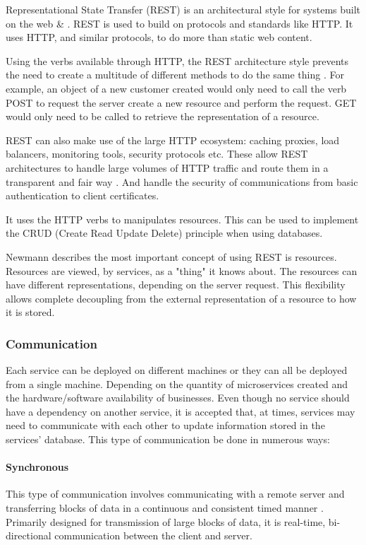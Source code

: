 Representational State Transfer (REST) is an architectural style for systems built on the web \cite{SchroderMSA} \& \cite{NewmanMSA}. REST is used to build on protocols and standards like HTTP.  It uses HTTP, and similar protocols, to do more than static web content. 

Using the verbs available through HTTP, the REST architecture style prevents the need to create a multitude of different methods to do the same thing \cite{NewmanMSA}. For example, an object of a new customer created would only need to call the verb POST to request the server create a new resource and perform the request. GET would only need to be called to retrieve the representation of a resource. 

REST can also make use of the large HTTP ecosystem: caching proxies, load balancers, monitoring tools, security protocols etc. These allow REST architectures to handle large volumes of HTTP traffic and route them in a transparent and fair way \cite{NewmanMSA}. And handle the security of communications from basic authentication to client certificates.

It uses the HTTP verbs to manipulates resources. This can be used to implement the CRUD (Create Read Update Delete) principle when using databases.

Newmann \cite{NewmanMSA} describes the most important concept of using REST is resources. Resources are viewed, by services, as a "thing" it knows about. The resources can have different representations, depending on the server request. This flexibility allows complete decoupling from the external representation of a resource to how it is stored.

\subsubsection{Communication}
Each service can be deployed on different machines or they can all be deployed from a single machine. Depending on the quantity of microservices created and the hardware/software availability of businesses.
Even though no service should have a dependency on another service, it is accepted that, at times, services may need to communicate with each other to update information stored in the services’ database. This type of communication be done in numerous ways:
	\paragraph{Synchronous}
	This type of communication involves communicating with a remote server and transferring blocks of data in a continuous and consistent timed manner \cite{SynchAsynch}. Primarily designed for transmission of large blocks of data, it is real-time, bi-directional communication between the client and server. 
	
